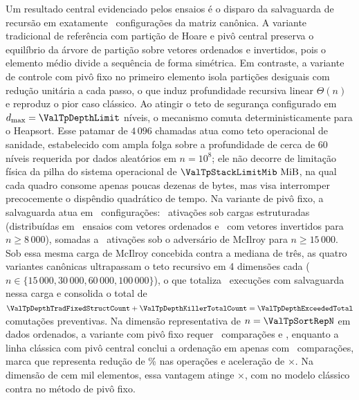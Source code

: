 \documentclass[12pt]{article}
\begin{document}
Um resultado central evidenciado pelos ensaios é o disparo da salvaguarda de recursão em exatamente \ValTpDepthExceededTotal\ configurações da matriz canônica. A variante tradicional de referência com partição de Hoare e pivô central preserva o equilíbrio da árvore de partição sobre vetores ordenados e invertidos, pois o elemento médio divide a sequência de forma simétrica. Em contraste, a variante de controle com pivô fixo no primeiro elemento isola partições desiguais com redução unitária a cada passo, o que induz profundidade recursiva linear $\Theta(n)$ e reproduz o pior caso clássico. Ao atingir o teto de segurança configurado em $d_{\max} = \ValTpDepthLimit$ níveis, o mecanismo comuta deterministicamente para o Heapsort. Esse patamar de $4\,096$ chamadas atua como teto operacional de sanidade, estabelecido com ampla folga sobre a profundidade de cerca de 60 níveis requerida por dados aleatórios em $n = 10^8$; ele não decorre de limitação física da pilha do sistema operacional de $\ValTpStackLimitMib\text{ MiB}$, na qual cada quadro consome apenas poucas dezenas de bytes, mas visa interromper precocemente o dispêndio quadrático de tempo. Na variante de pivô fixo, a salvaguarda atua em \ValTpDepthTradFixedTotalCount\ configurações: \ValTpDepthTradFixedStructCount\ ativações sob cargas estruturadas (distribuídas em \ValTpSortedDepthCount\ ensaios com vetores ordenados e \ValTpReverseDepthCount\ com vetores invertidos para $n \ge 8\,000$), somadas a \ValTpDepthTradFixedKillerCount\ ativações sob o adversário de McIlroy para $n \ge 15\,000$. Sob essa mesma carga de McIlroy concebida contra a mediana de três, as quatro variantes canônicas ultrapassam o teto recursivo em 4 dimensões cada ($n \in \{15\,000, 30\,000, 60\,000, 100\,000\}$), o que totaliza \ValTpDepthKillerTotalCount\ execuções com salvaguarda nessa carga e consolida o total de $\ValTpDepthTradFixedStructCount + \ValTpDepthKillerTotalCount = \ValTpDepthExceededTotal$ comutações preventivas. Na dimensão representativa de $n = \ValTpSortRepN$ em dados ordenados, a variante com pivô fixo requer \ValTpSortTradFixedCmp\ comparações e \ValTpSortedFixedMsApprox{}, enquanto a linha clássica com pivô central conclui a ordenação em apenas \ValTpSortedTradMsApprox{} com \ValTpSortTradCmp\ comparações, marca que representa redução de \ValTpSortMedCmpRedPct\% nas operações e aceleração de \ValTpSortMedSpeedupX$\times$. Na dimensão de cem mil elementos, essa vantagem atinge \ValTpSortHundredKSpeedupX$\times$, com \ValTpSortHundredKTradMs{} no modelo clássico contra \ValTpSortHundredKFixedMs{} no método de pivô fixo.
\end{document}
